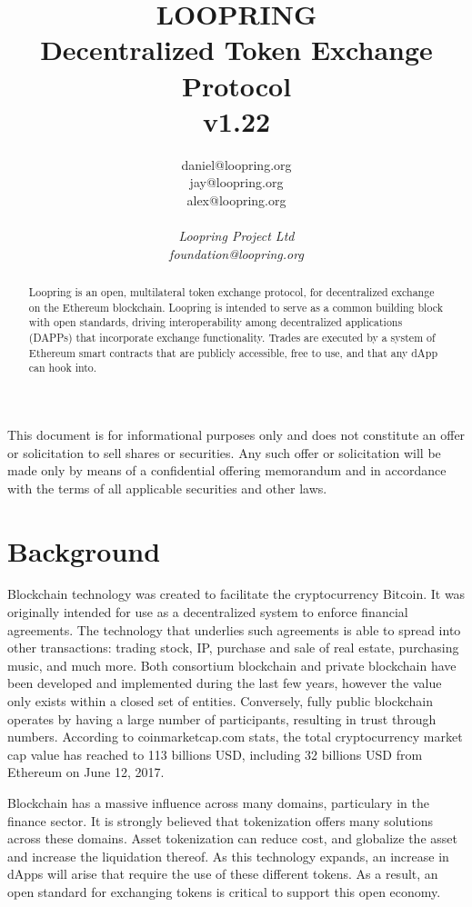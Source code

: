 \documentclass[UTF8,nofonts]{article}
\title{\textbf{LOOPRING}\\\textbf{Decentralized Token Exchange Protocol}\\v1.22}
\author{
  daniel@loopring.org\\
  jay@loopring.org\\
  alex@loopring.org\\ 
  \\
  \textit{Loopring Project Ltd}\\
  \textit{foundation@loopring.org}\\
 }
\begin{document}
\maketitle
This document is for informational purposes only and does not constitute an offer or solicitation to sell shares or securities. Any such offer or solicitation will be made only by means of a confidential offering memorandum and in accordance with the terms of all applicable securities and other laws.



\begin{abstract}
Loopring is an open, multilateral token exchange protocol, for decentralized exchange on the Ethereum blockchain. Loopring is intended to serve as a common building block with open standards, driving interoperability among decentralized applications (DAPPs) that incorporate exchange functionality. Trades are executed by a system of Ethereum smart contracts that are publicly accessible, free to use, and that any dApp can hook into.
\end{abstract}

\newpage

\tableofcontents
\newpage

\section{Background\label{sec: background}}

Blockchain\cite{staff2016blockchains}\cite{swan2015blockchain} technology was created to facilitate the cryptocurrency Bitcoin\cite{nakamoto2008Bitcoin}. It was originally intended for use as a decentralized system to enforce financial agreements\cite{lamport1982byzantine}\cite{christidis2016blockchains}. The technology that underlies such agreements is able to spread into other transactions: trading stock, IP, purchase and sale of real estate, purchasing music, and much more. Both consortium blockchain and private blockchain have been developed and implemented during the last few years, however the value only exists within a closed set of entities. Conversely, fully public blockchain operates by having a large number of participants, resulting in trust through numbers. According to coinmarketcap.com stats, the total cryptocurrency market cap value has reached to 113 billions USD,  including 32 billions USD from Ethereum\cite{wood2014ethereum} on June 12, 2017.

Blockchain has a massive influence across many domains,  particulary in the finance sector. It is strongly believed that tokenization\cite{liu2016medical}\cite{christidis2016blockchains}\cite{swan2015blockchain} offers many solutions across these domains. Asset tokenization can reduce cost, and globalize the asset and increase the liquidation thereof. As this technology expands, an increase in dApps will arise that require the use of these different tokens. As a result, an open standard for exchanging tokens is critical to support this open economy.
\end{document}
